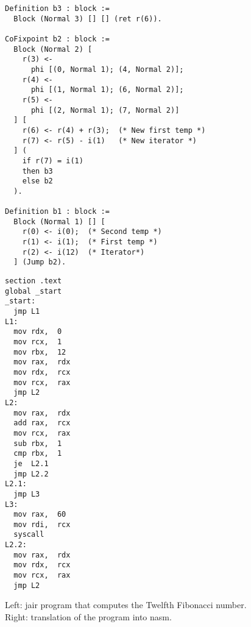 \begin{figure}[ht]
\begin{minipage}{0.68\linewidth}
\centering
\begin{lstlisting}[style=Rocq]
Definition b3 : block :=
  Block (Normal 3) [] [] (ret r(6)).

CoFixpoint b2 : block :=
  Block (Normal 2) [
    r(3) <-
      phi [(0, Normal 1); (4, Normal 2)];
    r(4) <-
      phi [(1, Normal 1); (6, Normal 2)];
    r(5) <-
      phi [(2, Normal 1); (7, Normal 2)]
  ] [
    r(6) <- r(4) + r(3);  (* New first temp *)
    r(7) <- r(5) - i(1)   (* New iterator *)
  ] (
    if r(7) = i(1)
    then b3
    else b2
  ).

Definition b1 : block :=
  Block (Normal 1) [] [
    r(0) <- i(0);  (* Second temp *)
    r(1) <- i(1);  (* First temp *)
    r(2) <- i(12)  (* Iterator*)
  ] (Jump b2).
\end{lstlisting}
\end{minipage}
\hfill
\begin{minipage}{0.28\linewidth}
\centering
\begin{lstlisting}[style=NASM]
section .text
global _start
_start:
  jmp L1
L1:
  mov rdx,  0
  mov rcx,  1
  mov rbx,  12
  mov rax,  rdx
  mov rdx,  rcx
  mov rcx,  rax
  jmp L2
L2:
  mov rax,  rdx
  add rax,  rcx
  mov rcx,  rax
  sub rbx,  1
  cmp rbx,  1
  je  L2.1
  jmp L2.2
L2.1:
  jmp L3
L3:
  mov rax,  60
  mov rdi,  rcx
  syscall
L2.2:
  mov rax,  rdx
  mov rdx,  rcx
  mov rcx,  rax
  jmp L2
\end{lstlisting}
\end{minipage}
\caption{Left: \gls{jair} program that computes the Twelfth Fibonacci number. Right: translation of the program into \gls{nasm}.}
\label{fig:ex3}
\end{figure}